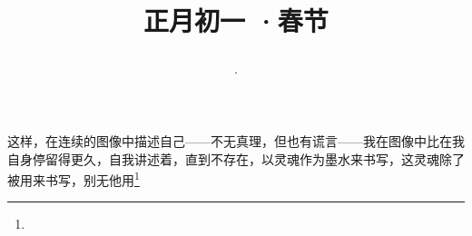 \title{\date[d=10,m=2,y=2024][year:cn-y,年,month:cn,day:cn,日,·,weekday]·正月初一 ·春节}
这样，在连续的图像中描述自己——不无真理，但也有谎言——我在图像中比在我自身停留得更久，自我讲述着，直到不存在，以灵魂作为墨水来书写，这灵魂除了被用来书写，别无他用\footnote{ }

